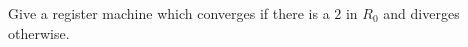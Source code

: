 \begin{problem}
  Give a register machine which converges if there is a $2$ in $R_0$
  and diverges otherwise.

  \begin{answer}
    
  \end{answer}
\end{problem}
